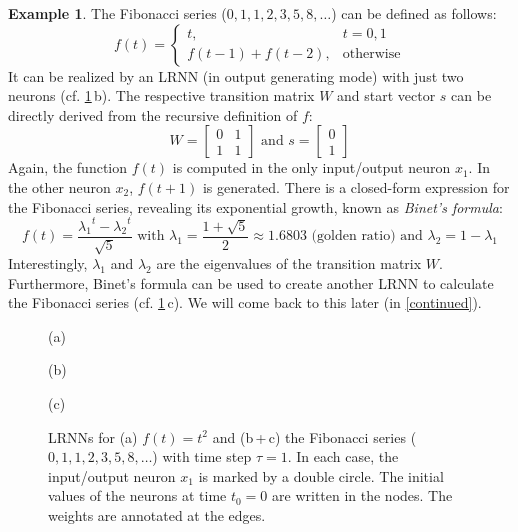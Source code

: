 \documentclass[twoside,11pt]{article}
\theoremstyle{definition}
\newtheorem{exmp}{Example}
\begin{document}
\begin{exmp}\label{fibonacci}
The Fibonacci series ($0,1,1,2,3,5,8,\dots$) can be defined as follows:
\[ f(t) = \left\{ \begin{array}{ll}
	t, & t=0,1\\
	f(t-1)+f(t-2), & \text{otherwise}
\end{array} \right. \]
It can be realized by an LRNN (in output generating mode) with just two neurons
(cf. \cref{examples}\,b). The respective transition matrix $W$ and start vector
$s$ can be directly derived from the recursive definition of $f$:
\[ W = \left[ \begin{array}{cc}
	0 & 1\\
	1 & 1
   \end{array} \right]
   \text{~and~} s = \left[ \begin{array}{c}
	0\\
	1
   \end{array} \right]
\]
Again, the function $f(t)$ is computed in the only input/output neuron $x_1$. In
the other neuron $x_2$, $f(t+1)$ is generated. There is a closed-form expression
for the Fibonacci series, revealing its exponential growth, known as
\emph{Binet's formula}:
\begin{equation}\label{binet}
   f(t) = \frac{{\lambda_1}^t-{\lambda_2}^t}{\sqrt{5}}
	\text{~with~} \lambda_1 = \displaystyle\frac{1+\sqrt{5}}{2} \approx 1.6803
	\text{~(golden ratio) and~} \lambda_2 = 1-\lambda_1
\end{equation}
Interestingly, $\lambda_1$ and $\lambda_2$ are the eigenvalues of the transition
matrix $W$. Furthermore, Binet's formula can be used to create another LRNN to
calculate the Fibonacci series (cf. \cref{examples}\,c). We will come back to
this later (in \cref{continued}).
\end{exmp}

\begin{figure}
  \begin{minipage}[t]{0.3\textwidth}
	(a) 
  \end{minipage}
	\hfill
  \begin{minipage}[t]{0.3\textwidth}
	(b) 
  \end{minipage}
	\hfill
  \begin{minipage}[t]{0.34\textwidth}
	(c) 
  \end{minipage}
  \caption{LRNNs for (a) $f(t) = t^2$ and (b\,+\,c) the Fibonacci series
	($0,1,1,2,3,5,8,\dots$) with time step $\tau=1$. In each case, the input/output neuron
	$x_1$ is marked by a double circle. The initial values of the neurons at
	time $t_0=0$ are written in the nodes. The weights are annotated at the
	edges.}
  \label{examples}
\end{figure}
\end{document}
